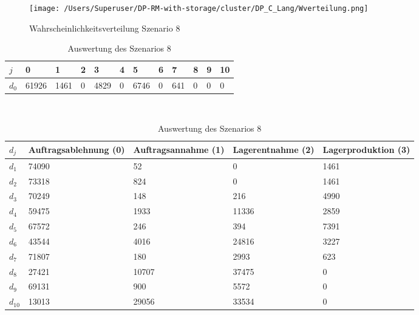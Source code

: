 \begin{figure}[h!]
  \begin{center}
    \texttt{[image: /Users/Superuser/DP-RM-with-storage/cluster/DP\_C\_Lang/Wverteilung.png]}
    \caption{Wahrscheinlichkeitsverteilung Szenario 8}  \label{SB8}
  \end{center}
\end{figure}

\begin{table}[h!]
\renewcommand{\arraystretch}{1.5}
  \begin{center}
    \caption{Auswertung des Szenarios 8}  \label{AS8}
    \vspace*{3mm}
    \begin{tabular}{l l l l l l l l l l l l }  \hline 
         $j$ & 0 & 1  & 2 & 3 & 4  & 5 & 6 & 7 & 8 & 9 & 10  \\  \hline
$d_{0}$ &  61926 &  1461 &  0 &  4829 &  0 &  6746 &  0 &  641 &  0 &  0 &  0 \\\hline
    \end{tabular} \\[3mm]
        \begin{tabular}{ l p{2.5cm} p{2.5cm} p{2.5cm} p{2.5cm} }   \hline    %
    $d_j$ & Auftrags\-ablehnung (0) & Auftrags\-annahme (1)  & Lager\-entnahme (2) & Lager\-produktion (3)\\\hline 
$d_{1}$  &  74090 &     52 &    0 &  1461 \\
$d_{2}$  &  73318 &    824 &    0 &  1461 \\
$d_{3}$  &  70249 &    148 &    216 &  4990 \\
$d_{4}$  &  59475 &   1933 &  11336 &  2859 \\
$d_{5}$  &  67572 &    246 &    394 &  7391 \\
$d_{6}$  &  43544 &   4016 &  24816 &  3227 \\
$d_{7}$  &  71807 &    180 &   2993 &   623 \\
$d_{8}$  &  27421 &  10707 &  37475 &   0 \\
$d_{9}$  &  69131 &    900 &   5572 &   0 \\
$d_{10}$ &  13013 &  29056 &  33534 &   0 \\
          \hline
   \end{tabular} \\[3mm]
     \end{center}
\end{table}


